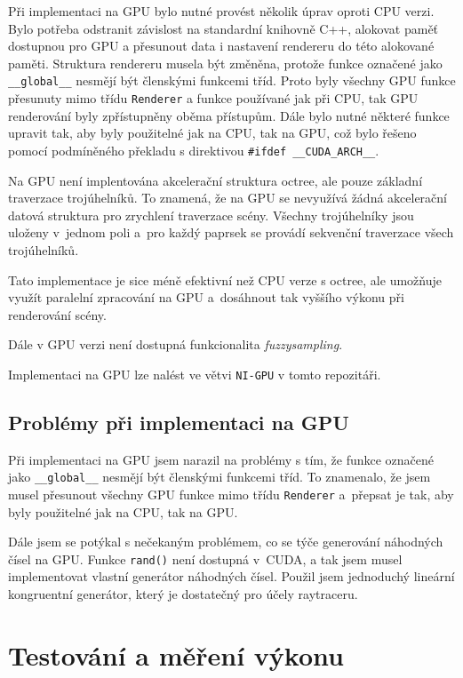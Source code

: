 \documentclass[10pt,a4paper]{article}
\begin{document}
Při implementaci na GPU bylo nutné provést několik úprav oproti CPU verzi. Bylo potřeba odstranit závislost na standardní knihovně C++, alokovat paměť dostupnou pro GPU a přesunout data i nastavení rendereru do této alokované paměti. Struktura rendereru musela být změněna, protože funkce označené jako \texttt{\_\_global\_\_} nesmějí být členskými funkcemi tříd. Proto byly všechny GPU funkce přesunuty mimo třídu \texttt{Renderer} a funkce používané jak při CPU, tak GPU renderování byly zpřístupněny oběma přístupům. Dále bylo nutné některé funkce upravit tak, aby byly použitelné jak na CPU, tak na GPU, což bylo řešeno pomocí podmíněného překladu s direktivou \texttt{\#ifdef \_\_CUDA\_ARCH\_\_}.

Na GPU není implentována akcelerační struktura octree, ale pouze základní traverzace trojúhelníků. To znamená, že na GPU se nevyužívá žádná akcelerační datová struktura pro zrychlení traverzace scény. Všechny trojúhelníky jsou uloženy v~jednom poli a~pro každý paprsek se provádí sekvenční traverzace všech trojúhelníků.

Tato implementace je sice méně efektivní než CPU verze s octree, ale umožňuje využít paralelní zpracování na GPU a~dosáhnout tak vyššího výkonu při renderování scény.

Dále v GPU verzi není dostupná funkcionalita \textit{fuzzysampling}.

Implementaci na GPU lze nalést ve větvi \texttt{NI-GPU} v tomto repozitáři.

\subsection{Problémy při implementaci na GPU}

Při implementaci na GPU jsem narazil na problémy s tím, že funkce označené jako \texttt{\_\_global\_\_} nesmějí být členskými funkcemi tříd. To znamenalo, že jsem musel přesunout všechny GPU funkce mimo třídu \texttt{Renderer} a~přepsat je tak, aby byly použitelné jak na CPU, tak na GPU.

Dále jsem se potýkal s nečekaným problémem, co se týče generování náhodných čísel na GPU. Funkce \texttt{rand()} není dostupná v~CUDA, a tak jsem musel implementovat vlastní generátor náhodných čísel. Použil jsem jednoduchý lineární kongruentní generátor, který je dostatečný pro účely raytraceru.


\section{Testování a měření výkonu}
\end{document}
